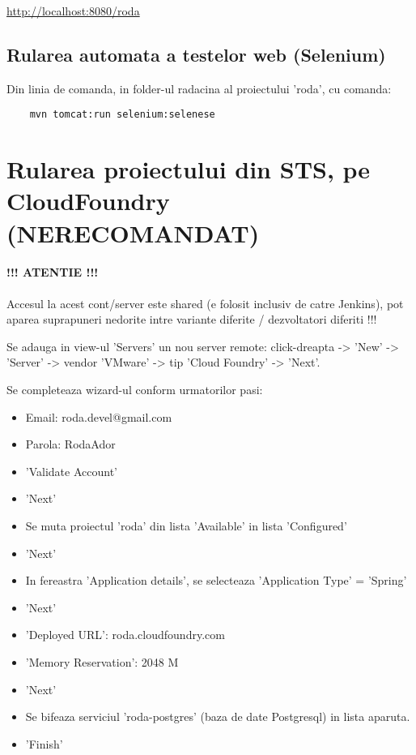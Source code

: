 \url{http://localhost:8080/roda}

\subsection{Rularea automata a testelor web (Selenium)}
Din linia de comanda, in folder-ul radacina al proiectului 'roda', cu comanda:
\begin{lstlisting}
	mvn tomcat:run selenium:selenese
\end{lstlisting}

\section{Rularea proiectului din STS, pe CloudFoundry (NERECOMANDAT)}

\paragraph{!!! ATENTIE !!!} 
Accesul la acest cont/server este shared (e folosit
inclusiv de catre Jenkins), 
pot aparea suprapuneri nedorite intre variante diferite / dezvoltatori diferiti !!!

Se adauga in view-ul 'Servers' un nou server remote: click-dreapta -> 'New'
-> 'Server' -> vendor 'VMware' -> tip 'Cloud Foundry' -> 'Next'.

Se completeaza wizard-ul conform urmatorilor pasi:
\begin{itemize}
  \item 
Email: roda.devel@gmail.com
  \item 
Parola: RodaAdor
  \item 
'Validate Account'
  \item 
'Next'
  \item 
Se muta proiectul 'roda' din lista 'Available' in lista 'Configured'
  \item 
'Next'
  \item 
In fereastra 'Application details', se selecteaza 'Application Type' = 'Spring'
  \item 
'Next'
  \item 
'Deployed URL': roda.cloudfoundry.com
  \item 
'Memory Reservation': 2048 M
  \item 
'Next'
  \item 
Se bifeaza serviciul 'roda-postgres' (baza de date Postgresql) in lista
aparuta.
  \item 
'Finish'
\end{itemize}

